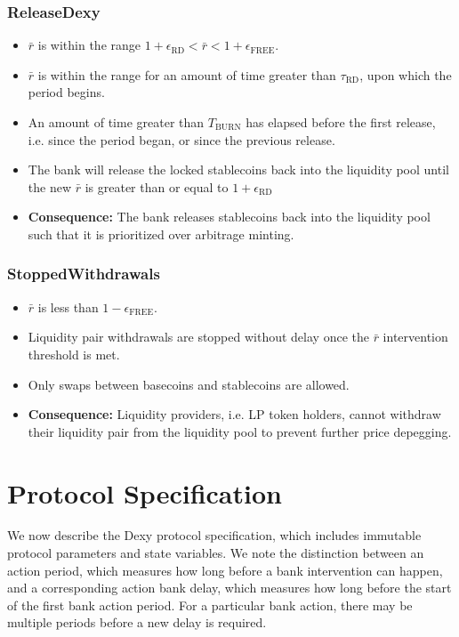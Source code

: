 \documentclass{ifcolog}
\newcommand{\rr}{\bar{r}}
\newcommand{\dx}{Dexy}
\begin{document}
\newpage 

\subsubsection{ReleaseDexy}
  \begin{itemize}
    \item $\rr$ is within the range $1 + \epsilon_{\textrm{RD}} < \rr <  1 + \epsilon_{\textrm{FREE}}$.
    \item $\rr$ is within the range for an amount of time greater than $\tau_{\textrm{RD}}$, upon which the period begins.
    \item An amount of time greater than $T_{\textrm{BURN}}$ has elapsed before the first release, i.e. since the period began, or since the previous release. 
    \item The bank will release the locked stablecoins back into the liquidity pool until the new $\rr$ is greater than or equal to $1 + \epsilon_{\textrm{RD}}$
    \item \textbf{Consequence:} The bank releases stablecoins back into the liquidity pool such that it is prioritized over arbitrage minting.
  \end{itemize}

\subsubsection{StoppedWithdrawals}
  \begin{itemize}
    \item $\rr$ is less than $1 - \epsilon_{\textrm{FREE}}$.
    \item Liquidity pair withdrawals are stopped without delay once the $\rr$ intervention threshold is met.
    \item Only swaps between basecoins and stablecoins are allowed.
    \item \textbf{Consequence:} Liquidity providers, i.e. LP token holders, cannot withdraw their liquidity pair from the liquidity pool to prevent further price depegging.
  \end{itemize}

\section{Protocol Specification}
\label{sec:protocol}
We now describe the \dx{} protocol specification, which includes immutable protocol parameters and state variables. 
We note the distinction between an action period, which measures how long before a bank intervention can happen, 
and a corresponding action bank delay, which measures how long before the start of the first bank action period. 
For a particular bank action, there may be multiple periods before a new delay is required.
\end{document}
